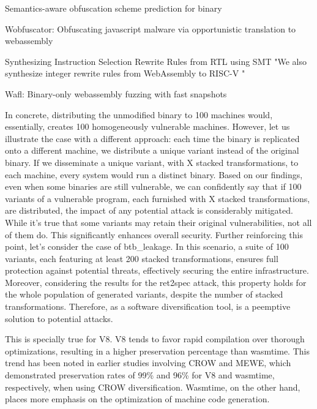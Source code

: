 Semantics-aware obfuscation scheme prediction for binary

Wobfuscator: Obfuscating javascript malware via opportunistic translation to webassembly

Synthesizing Instruction Selection Rewrite Rules from RTL using SMT
"We also synthesize integer rewrite rules from WebAssembly to RISC-V "

Wafl: Binary-only webassembly fuzzing with fast snapshots



In concrete, distributing the unmodified binary to 100 machines would, essentially, creates 100 homogeneously vulnerable machines.
However, let us illustrate the case with a different approach: each time the binary is replicated onto a different machine, we distribute a unique variant instead of the original binary. 
If we disseminate a unique variant, with X stacked transformations, to each machine, every system would run a distinct \wasm binary. 
Based on our findings, even when some binaries are still vulnerable, we can confidently say that if 100 variants of a vulnerable program, each furnished with X stacked transformations, are distributed, the impact of any potential attack is considerably mitigated.
While it's true that some variants may retain their original vulnerabilities, not all of them do. 
This significantly enhances overall security. 
Further reinforcing this point, let's consider the case of btb\_leakage. 
In this scenario, a suite of 100 variants, each featuring at least 200 stacked transformations, ensures full protection against potential threats, effectively securing the entire infrastructure.
Moreover, considering the results for the ret2spec attack, this property holds for the whole population of generated variants, despite the number of stacked transformations.
Therefore, \tool as a software diversification tool, is a peemptive solution to potential attacks.



This is specially true for V8.
V8 tends to favor rapid compilation over thorough optimizations, resulting in a higher preservation percentage than wasmtime. 
This trend has been noted in earlier studies involving CROW and MEWE, which demonstrated preservation rates of 99\% and 96\% for V8 and wasmtime, respectively, when using CROW diversification. 
Wasmtime, on the other hand, places more emphasis on the optimization of machine code generation.

